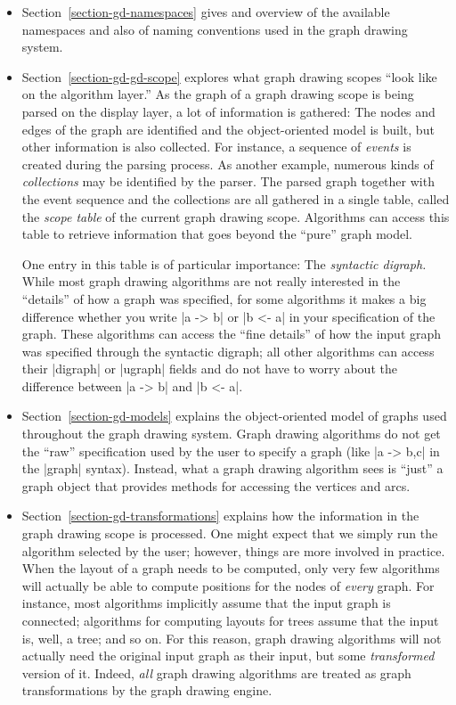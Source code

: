 \begin{itemize}
\item Section~\ref{section-gd-namespaces} gives and overview of the
  available namespaces and also of naming conventions used in the
  graph drawing system.
\item Section~\ref{section-gd-gd-scope} explores what graph
  drawing scopes ``look like on the algorithm layer.'' As the graph
  of a graph drawing scope is being parsed on the display layer, a lot
  of information is gathered: The nodes and edges of the graph are
  identified and the 
  object-oriented model is built, but other information is also
  collected. For instance, a sequence of \emph{events} is created
  during the parsing process. As another example, numerous kinds of
  \emph{collections} may be identified by the parser. The parsed graph
  together with the event sequence and the collections are all
  gathered in a single table, called the \emph{scope table} of the
  current graph drawing scope. Algorithms can access this table to
  retrieve information that goes beyond the ``pure'' graph model.

  One entry in this table is of particular importance: The
  \emph{syntactic digraph.} While most graph drawing 
  algorithms are not really interested in the ``details'' of how a
  graph was specified, for some algorithms it makes a big difference
  whether you write |a -> b| or |b <- a| in your specification of the
  graph. These algorithms can access the ``fine details'' of how the
  input graph was specified through the syntactic digraph; all other
  algorithms can access their |digraph| or |ugraph| fields and do not
  have to worry about the difference between |a -> b| and |b <- a|.
\item Section~\ref{section-gd-models} explains the object-oriented
  model of graphs used throughout the graph drawing system. Graph
  drawing algorithms do not get the ``raw'' specification used by the
  user to specify a graph (like |{a -> {b,c}}| in the |graph|
  syntax). Instead, what a graph drawing algorithm sees is ``just'' a
  graph object that provides methods for accessing the vertices and
  arcs.
\item Section~\ref{section-gd-transformations} explains how the
  information in the graph drawing scope is processed. One might
  expect that we simply run the algorithm selected by the user;
  however, things are more involved in practice. When the layout of a
  graph needs to be computed, only very few algorithms will actually
  be able to compute positions for the nodes of \emph{every}
  graph. For instance, most algorithms implicitly assume that the
  input graph is connected; algorithms for computing layouts for trees
  assume that the input is, well, a tree; and so on. For this reason,
  graph drawing algorithms will not actually need the original input
  graph as their input, but some \emph{transformed} version of
  it. Indeed, \emph{all} graph drawing algorithms are treated as graph 
  transformations by the graph drawing engine.


\end{itemize}
